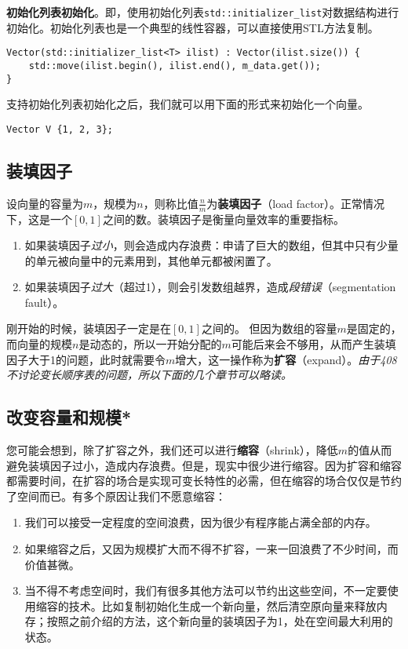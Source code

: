 \textbf{初始化列表初始化}。即，使用初始化列表\lstinline{std::initializer_list}对数据结构进行初始化。初始化列表也是一个典型的线性容器，可以直接使用STL方法复制。

\begin{lstlisting}
Vector(std::initializer_list<T> ilist) : Vector(ilist.size()) { 
    std::move(ilist.begin(), ilist.end(), m_data.get()); 
}
\end{lstlisting}

支持初始化列表初始化之后，我们就可以用下面的形式来初始化一个向量。
\begin{lstlisting}
Vector V {1, 2, 3};
\end{lstlisting}

\subsection{装填因子}
设向量的容量为$m$，规模为$n$，则称比值$\frac{n}m$为\textbf{装填因子}（load factor）。正常情况下，这是一个$[0,1]$之间的数。装填因子是衡量向量效率的重要指标。

\begin{enumerate}
    \item 如果装填因子\textit{过小}，则会造成内存浪费：申请了巨大的数组，但其中只有少量的单元被向量中的元素用到，其他单元都被闲置了。
    \item 如果装填因子\textit{过大}（超过1），则会引发数组越界，造成\textit{段错误}（segmentation fault）。
\end{enumerate}

刚开始的时候，装填因子一定是在$[0,1]$之间的。
但因为数组的容量$m$是固定的，而向量的规模$n$是动态的，所以一开始分配的$m$可能后来会不够用，从而产生装填因子大于1的问题，此时就需要令$m$增大，这一操作称为\textbf{扩容}（expand）。\textit{由于408不讨论变长顺序表的问题，所以下面的几个章节可以略读。}

\subsection{改变容量和规模*}

您可能会想到，除了扩容之外，我们还可以进行\textbf{缩容}（shrink），降低$m$的值从而避免装填因子过小，造成内存浪费。但是，现实中很少进行缩容。因为扩容和缩容都需要时间，在扩容的场合是实现可变长特性的必需，但在缩容的场合仅仅是节约了空间而已。有多个原因让我们不愿意缩容：
\begin{enumerate}
    \item 我们可以接受一定程度的空间浪费，因为很少有程序能占满全部的内存。
    \item 如果缩容之后，又因为规模扩大而不得不扩容，一来一回浪费了不少时间，而价值甚微。
    \item 当不得不考虑空间时，我们有很多其他方法可以节约出这些空间，不一定要使用缩容的技术。比如复制初始化生成一个新向量，然后清空原向量来释放内存；按照之前介绍的方法，这个新向量的装填因子为1，处在空间最大利用的状态。
\end{enumerate}

